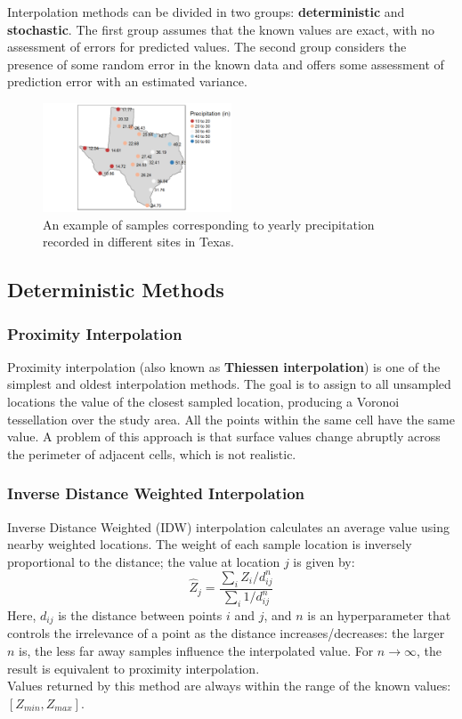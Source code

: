 Interpolation methods can be divided in two groups: \textbf{deterministic} and \textbf{stochastic}. The first group assumes that the known values are exact, with no assessment of errors for predicted values. The second group considers the presence of some random error in the known data and offers some assessment of prediction error with an estimated variance.
\begin{figure}[!ht]
    \centering
    \includegraphics[width=0.5\textwidth]{img/interpolation_original.png}
    \caption{An example of samples corresponding to yearly precipitation recorded in different sites in Texas.}
    \label{fig:interpolation_original}
\end{figure}

\subsection{Deterministic Methods}

\subsubsection{Proximity Interpolation}

Proximity interpolation (also known as \textbf{Thiessen interpolation}) is one of the simplest and oldest interpolation methods. The goal is to assign to all unsampled locations the value of the closest sampled location, producing a Voronoi tessellation over the study area. All the points within the same cell have the same value. A problem of this approach is that surface values change abruptly across the perimeter of adjacent cells, which is not realistic.

\subsubsection{Inverse Distance Weighted Interpolation}

Inverse Distance Weighted (IDW) interpolation calculates an average value using nearby weighted locations. The weight of each sample location is inversely proportional to the distance; the value at location $j$ is given by:
\begin{equation*}
    \hat{Z}_j = \frac{\sum_i Z_i / d_{ij}^n}{\sum_i 1 / d_{ij}^n}
\end{equation*}
Here, $d_{ij}$ is the distance between points $i$ and $j$, and $n$ is an hyperparameter that controls the irrelevance of a point as the distance increases/decreases: the larger $n$ is, the less far away samples influence the interpolated value. For $n \rightarrow \infty$, the result is equivalent to proximity interpolation. \\
Values returned by this method are always within the range of the known values: $[Z_{min}, Z_{max}]$.

